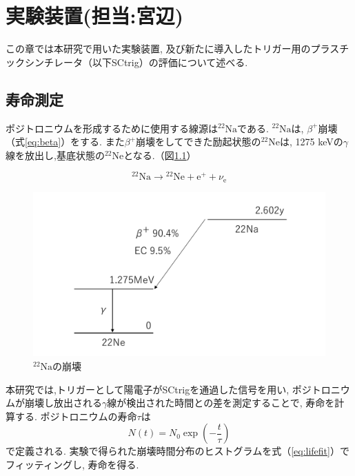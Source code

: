 \chapter{実験装置(担当:宮辺)}
\label{apparatus}


この章では本研究で用いた実験装置,
及び新たに導入したトリガー用のプラスチックシンチレータ（以下SCtrig）の評価について述べる.


\section{寿命測定}

ポジトロニウムを形成するために使用する線源は$\mathrm{^{22}Na}$である.
$\mathrm{^{22}Na}$は,
$\beta^{+}$崩壊（式\ref{eq:beta}）をする.
また$\beta^{+}$崩壊をしてできた励起状態の$\mathrm{^{22}Ne}$は,
1275 keVの$\gamma$線を放出し,基底状態の$\mathrm{^{22}Ne}$となる.（図\ref{fig:na}）

\begin{equation}
\mathrm{^{22}Na} \to \mathrm{^{22}Ne} + \mathrm{e^{+}} + \nu_{\mathrm{e}}
\label{eq:beta}
\end{equation}

\begin{figure}[H]
\centering
\includegraphics[keepaspectratio,scale=0.4]{fig/ybm/na.pdf}
\caption{$\mathrm{^{22}Na}$の崩壊}
\label{fig:na}
\end{figure}

本研究では,トリガーとして陽電子がSCtrigを通過した信号を用い,
ポジトロニウムが崩壊し放出される$\gamma$線が検出された時間との差を測定することで,
寿命を計算する.
ポジトロニウムの寿命$\tau$は
\begin{equation}
N(t) = N_{0} \exp( - \frac{t}{\tau})
\label{eq:lifefit}
\end{equation}
で定義される.
実験で得られた崩壊時間分布のヒストグラムを式（\ref{eq:lifefit}）でフィッティングし,
寿命を得る.


